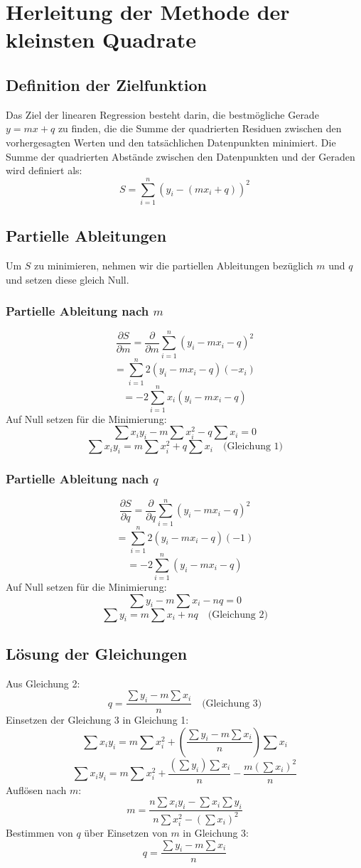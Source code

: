 \chapter{Herleitung der Methode der kleinsten Quadrate}\label{sec:appendixKleinsteQuadrate}

\section*{Definition der Zielfunktion}
Das Ziel der linearen Regression besteht darin, die bestmögliche Gerade $y = mx + q$ zu finden, die die Summe der quadrierten Residuen zwischen den vorhergesagten Werten und den tatsächlichen Datenpunkten minimiert. Die Summe der quadrierten Abstände zwischen den Datenpunkten und der Geraden wird definiert als:
$$
S = \sum_{i=1}^n (y_i - (mx_i + q))^2
$$

\section*{Partielle Ableitungen}
Um $S$ zu minimieren, nehmen wir die partiellen Ableitungen bezüglich $m$ und $q$ und setzen diese gleich Null.

\subsection*{Partielle Ableitung nach $m$}
$$
\frac{\partial S}{\partial m} = \frac{\partial}{\partial m} \sum_{i=1}^n (y_i - mx_i - q)^2
$$
$$
= \sum_{i=1}^n 2(y_i - mx_i - q)(-x_i)
$$
$$
= -2 \sum_{i=1}^n x_i(y_i - mx_i - q)
$$
Auf Null setzen für die Minimierung:
$$
\sum x_iy_i - m\sum x_i^2 - q\sum x_i = 0
$$
$$
\sum x_iy_i = m\sum x_i^2 + q\sum x_i \quad \text{(Gleichung 1)}
$$

\subsection*{Partielle Ableitung nach $q$}
$$
\frac{\partial S}{\partial q} = \frac{\partial}{\partial q} \sum_{i=1}^n (y_i - mx_i - q)^2
$$
$$
= \sum_{i=1}^n 2(y_i - mx_i - q)(-1)
$$
$$
= -2 \sum_{i=1}^n (y_i - mx_i - q)
$$
Auf Null setzen für die Minimierung:
$$
\sum y_i - m\sum x_i - nq = 0
$$
$$
\sum y_i = m\sum x_i + nq \quad \text{(Gleichung 2)}
$$

\section*{Lösung der Gleichungen}
Aus Gleichung 2:
$$
q = \frac{\sum y_i - m\sum x_i}{n} \quad \text{(Gleichung 3)}
$$
Einsetzen der Gleichung 3 in Gleichung 1:
$$
\sum x_iy_i = m\sum x_i^2 + \left(\frac{\sum y_i - m\sum x_i}{n}\right)\sum x_i
$$
$$
\sum x_iy_i = m\sum x_i^2 + \frac{(\sum y_i)\sum x_i}{n} - \frac{m(\sum x_i)^2}{n}
$$
Auflösen nach $m$:
$$
m = \frac{n\sum x_iy_i - \sum x_i \sum y_i}{n\sum x_i^2 - (\sum x_i)^2}
$$
Bestimmen von $q$ über Einsetzen von $m$ in Gleichung 3:
$$
q = \frac{\sum y_i - m\sum x_i}{n}
$$


